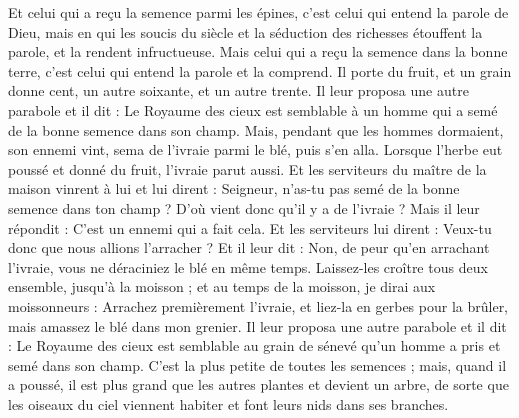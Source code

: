 \begin{multicols}{2}
Et celui qui a reçu la semence parmi les épines, c'est celui qui entend la parole de Dieu, mais en qui les soucis du siècle et la séduction des richesses étouffent la parole, et la rendent infructueuse.
Mais celui qui a reçu la semence dans la bonne terre, c'est celui qui entend la parole et la comprend. Il porte du fruit, et un grain donne cent, un autre soixante, et un autre trente.
Il leur proposa une autre parabole et il dit : Le Royaume des cieux est semblable à un homme qui a semé de la bonne semence dans son champ.
Mais, pendant que les hommes dormaient, son ennemi vint, sema de l'ivraie parmi le blé, puis s'en alla.
Lorsque l’herbe eut poussé et donné du fruit, l’ivraie parut aussi.
Et les serviteurs du maître de la maison vinrent à lui et lui dirent : Seigneur, n'as-tu pas semé de la bonne semence dans ton champ ? D’où vient donc qu'il y a de l'ivraie ?
Mais il leur répondit : C’est un ennemi qui a fait cela. Et les serviteurs lui dirent : Veux-tu donc que nous allions l’arracher ?
Et il leur dit : Non, de peur qu’en arrachant l'ivraie, vous ne déraciniez le blé en même temps.
Laissez-les croître tous deux ensemble, jusqu'à la moisson ; et au temps de la moisson, je dirai aux moissonneurs : Arrachez premièrement l'ivraie, et liez-la en gerbes pour la brûler, mais amassez le blé dans mon grenier.
Il leur proposa une autre parabole et il dit : Le Royaume des cieux est semblable au grain de sénevé qu’un homme a pris et semé dans son champ.
C’est la plus petite de toutes les semences ; mais, quand il a poussé, il est plus grand que les autres plantes et devient un arbre, de sorte que les oiseaux du ciel viennent habiter et font leurs nids dans ses branches.

\end{multicols}
